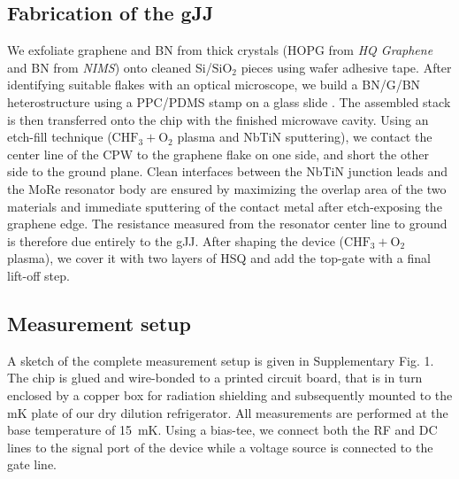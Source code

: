 \subsection*{Fabrication of the gJJ}
We exfoliate graphene and BN from thick crystals (HOPG from \textit{HQ Graphene} and BN from \textit{NIMS}\cite{taniguchi_synthesis_2007}) onto cleaned Si/$\mathrm{SiO_2}$ pieces using wafer adhesive tape.
After identifying suitable flakes with an optical microscope, we build a BN/G/BN heterostructure using a PPC/PDMS stamp on a glass slide \cite{pizzocchero_hot_2016,wang_onedimensional_2013}.
The assembled stack is then transferred onto the chip with the finished microwave cavity.
Using an etch-fill technique ($\mathrm{CHF_3 + O_2}$ plasma and NbTiN sputtering), we contact the center line of the CPW to the graphene flake on one side, and short the other side to the ground plane.
Clean interfaces between the NbTiN junction leads and the MoRe resonator body are ensured by maximizing the overlap area of the two materials and immediate sputtering of the contact metal after etch-exposing the graphene edge.
The resistance measured from the resonator center line to ground is therefore due entirely to the gJJ.
After shaping the device ($\mathrm{CHF_3 + O_2}$ plasma), we cover it with two layers of HSQ \cite{nanda_currentphase_2017} and add the top-gate with a final lift-off step.

\subsection*{Measurement setup}\label{sec:setup}
\noindent A sketch of the complete measurement setup is given in Supplementary Fig. 1.
The chip is glued and wire-bonded to a printed circuit board, that is in turn enclosed by a copper box for radiation shielding and subsequently mounted to the mK plate of our dry dilution refrigerator.
All measurements are performed at the base temperature of \SI{15}{mK}.
Using a bias-tee, we connect both the RF and DC lines to the signal port of the device while a voltage source is connected to the gate line.

